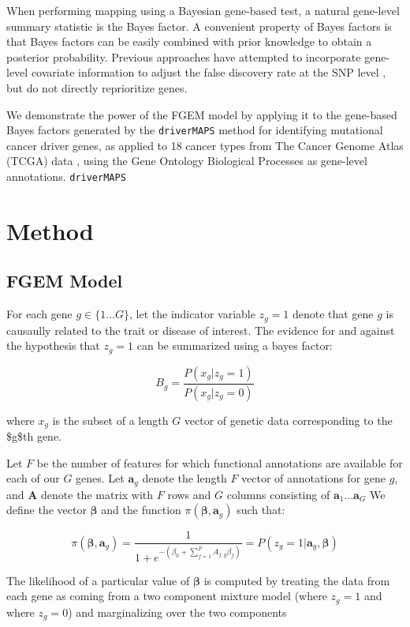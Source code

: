 When performing mapping using a Bayesian gene-based test, a natural gene-level summary statistic is the Bayes factor. A convenient property of Bayes factors is that Bayes factors can be easily combined with prior knowledge to obtain a posterior probability.
Previous approaches have attempted to incorporate gene-level covariate information to adjust the false discovery rate at the SNP level \cite{Zablocki_2014}, but do not directly reprioritize genes.


We demonstrate the power of the FGEM model by applying it to the gene-based Bayes factors generated by the \texttt{driverMAPS} method for identifying mutational cancer driver genes, as applied to 18 cancer types from The Cancer Genome Atlas (TCGA) data \cite{TCGA} \cite{drivermaps}, using the Gene Ontology Biological Processes as gene-level annotations. \texttt{driverMAPS} 


\section{Method}\label{sec:org4822ac5}

\subsection{FGEM Model}\label{sec:org4e93496}

For each gene \(g \in \{1 \dots G\}\), let the indicator variable \(z_g=1\) denote that gene \(g\) is causaully related to the trait or disease of interest.  The evidence for and against the hypothesis that \(z_g=1\) can be summarized using a bayes factor:

$$B_g=\frac{P(x_g|z_g=1)}{P(x_g|z_g=0)}$$

where \(x_g\) is the subset of a length $G$ vector of genetic data corresponding to the \$g\$th gene.

Let \(F\) be the number of features for which functional annotations are available for each of our \(G\) genes.  Let \(\textbf{a}_g\) denote the length \(F\) vector of annotations for gene \(g\), and \(\textbf{A}\) denote the matrix with \(F\) rows and \(G\) 
columns consisting of \(\textbf{a}_1 ...  \textbf{a}_G\)
We define the vector \(\boldsymbol{\beta}\) and the function \(\pi(\boldsymbol{\beta},\textbf{a}_g)\) such that:

$$\pi(\boldsymbol{\beta},\textbf{a}_g) =  \frac{1}{1+e^{-(\beta_{0}+\sum_{f=1}^F{A_{f,g}\beta_f})}} =  P(z_g=1|\textbf{a}_g,\boldsymbol{\beta})$$

The likelihood of a particular value of \(\boldsymbol{\beta}\) is computed by treating the data from each gene as coming from a two component mixture model (where \(z_g=1\) and where \(z_g=0\)) and marginalizing over the two components


